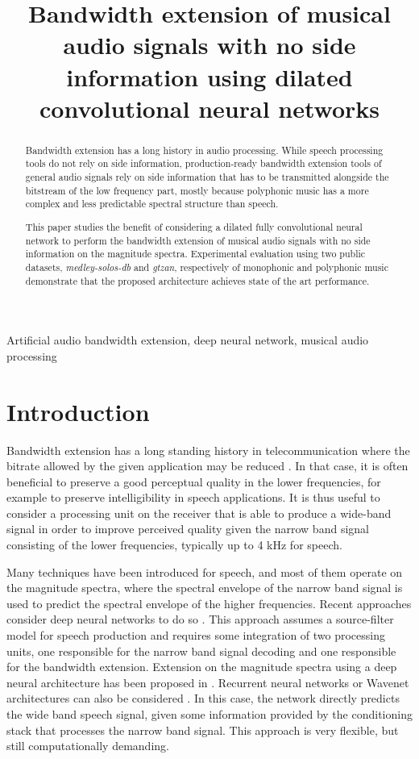\documentclass{article}
\title{Bandwidth extension of musical audio signals with no side information using dilated convolutional neural networks}
\begin{document}
%
\maketitle
%
\begin{abstract}

Bandwidth extension has a long history in audio processing. While speech processing tools do not rely on side information, production-ready bandwidth extension tools of general audio signals rely on side information that has to be transmitted alongside the bitstream of the low frequency part, mostly because polyphonic music has a more complex and less predictable spectral structure than speech.

This paper studies the benefit of considering a dilated fully convolutional neural network to perform the bandwidth extension of musical audio signals with no side information on the magnitude spectra. Experimental evaluation using two public datasets, \textit{medley-solos-db} and \textit{gtzan}, respectively of monophonic and polyphonic music demonstrate that the proposed architecture achieves state of the art performance.

\end{abstract}
%
\begin{keywords}
Artificial audio bandwidth extension, deep neural network, musical audio processing
\end{keywords}
%
\section{Introduction}
\label{sec:intro}

Bandwidth extension has a long standing history in telecommunication where the bitrate allowed by the given application may be reduced \cite{larsen2005audio}. In that case, it is often beneficial to preserve a good perceptual quality in the lower frequencies, for example to preserve intelligibility in speech applications. It is thus useful to consider a processing unit on the receiver that is able to produce a wide-band signal in order to improve perceived quality given the narrow band signal consisting of the lower frequencies, typically up to 4 kHz for speech.

Many techniques have been introduced for speech, and most of them operate on the magnitude spectra, where the spectral envelope of the narrow band signal is used to predict the spectral envelope of the higher frequencies. Recent approaches consider deep neural networks to do so \cite{abel2017artificial}. This approach assumes a source-filter model for speech production and requires some integration of two processing units, one responsible for the narrow band signal decoding and one responsible for the bandwidth extension. Extension on the magnitude spectra using a deep neural architecture has been proposed in \cite{li2015deep}. Recurrent neural networks \cite{ling2018waveform} or Wavenet architectures can also be considered \cite{gupta2019speech}. In this case, the network directly predicts the wide band speech signal, given some information provided by the conditioning stack that processes the narrow band signal. This approach is very flexible, but still computationally demanding.
\end{document}
